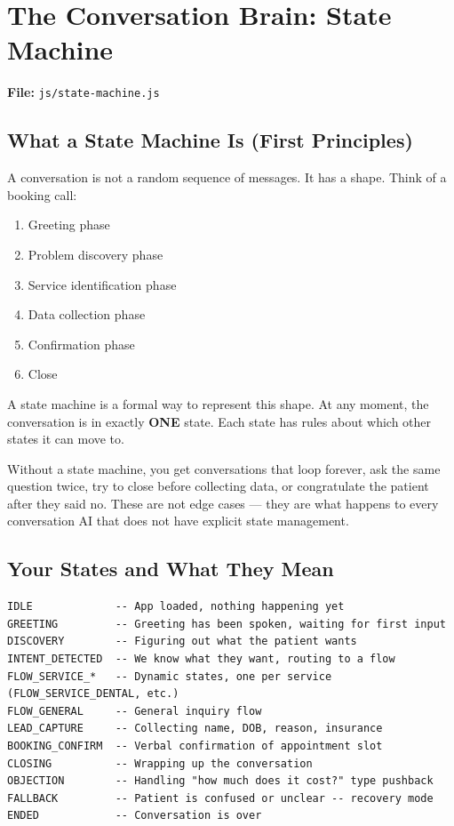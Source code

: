 \documentclass[12pt, a4paper]{report}
\newcommand{\ic}[1]{\texttt{\small\color{accentblue!70!black}#1}}
\begin{document}
\chapter{The Conversation Brain: State Machine}

\textbf{File:} \ic{js/state-machine.js}

\section{What a State Machine Is (First Principles)}

A conversation is not a random sequence of messages. It has a shape. Think of a booking
call:

\begin{enumerate}
  \item Greeting phase
  \item Problem discovery phase
  \item Service identification phase
  \item Data collection phase
  \item Confirmation phase
  \item Close
\end{enumerate}

A state machine is a formal way to represent this shape. At any moment, the conversation
is in exactly \textbf{ONE} state. Each state has rules about which other states it can
move to.

Without a state machine, you get conversations that loop forever, ask the same question
twice, try to close before collecting data, or congratulate the patient after they said
no. These are not edge cases --- they are what happens to every conversation AI that does
not have explicit state management.

\section{Your States and What They Mean}

\begin{lstlisting}
IDLE             -- App loaded, nothing happening yet
GREETING         -- Greeting has been spoken, waiting for first input
DISCOVERY        -- Figuring out what the patient wants
INTENT_DETECTED  -- We know what they want, routing to a flow
FLOW_SERVICE_*   -- Dynamic states, one per service (FLOW_SERVICE_DENTAL, etc.)
FLOW_GENERAL     -- General inquiry flow
LEAD_CAPTURE     -- Collecting name, DOB, reason, insurance
BOOKING_CONFIRM  -- Verbal confirmation of appointment slot
CLOSING          -- Wrapping up the conversation
OBJECTION        -- Handling "how much does it cost?" type pushback
FALLBACK         -- Patient is confused or unclear -- recovery mode
ENDED            -- Conversation is over
\end{lstlisting}
\end{document}
